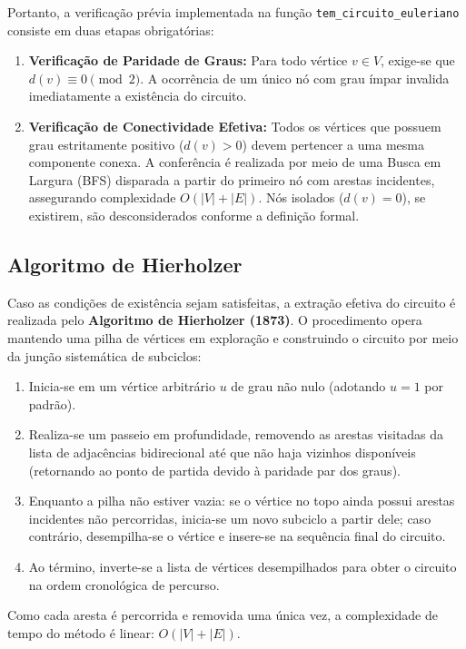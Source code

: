 \documentclass[12pt,a4paper]{article}
\begin{document}
Portanto, a verificação prévia implementada na função \texttt{tem\_circuito\_euleriano} consiste em duas etapas obrigatórias:
\begin{enumerate}
    \item \textbf{Verificação de Paridade de Graus:} Para todo vértice $v \in V$, exige-se que $d(v) \equiv 0 \pmod 2$. A ocorrência de um único nó com grau ímpar invalida imediatamente a existência do circuito.
    \item \textbf{Verificação de Conectividade Efetiva:} Todos os vértices que possuem grau estritamente positivo ($d(v) > 0$) devem pertencer a uma mesma componente conexa. A conferência é realizada por meio de uma Busca em Largura (BFS) disparada a partir do primeiro nó com arestas incidentes, assegurando complexidade $O(|V| + |E|)$. Nós isolados ($d(v) = 0$), se existirem, são desconsiderados conforme a definição formal.
\end{enumerate}

\subsection{Algoritmo de Hierholzer}
Caso as condições de existência sejam satisfeitas, a extração efetiva do circuito é realizada pelo \textbf{Algoritmo de Hierholzer (1873)}. O procedimento opera mantendo uma pilha de vértices em exploração e construindo o circuito por meio da junção sistemática de subciclos:

\begin{enumerate}
    \item Inicia-se em um vértice arbitrário $u$ de grau não nulo (adotando $u = 1$ por padrão).
    \item Realiza-se um passeio em profundidade, removendo as arestas visitadas da lista de adjacências bidirecional até que não haja vizinhos disponíveis (retornando ao ponto de partida devido à paridade par dos graus).
    \item Enquanto a pilha não estiver vazia: se o vértice no topo ainda possui arestas incidentes não percorridas, inicia-se um novo subciclo a partir dele; caso contrário, desempilha-se o vértice e insere-se na sequência final do circuito.
    \item Ao término, inverte-se a lista de vértices desempilhados para obter o circuito na ordem cronológica de percurso.
\end{enumerate}

Como cada aresta é percorrida e removida uma única vez, a complexidade de tempo do método é linear: $O(|V| + |E|)$.
\end{document}
